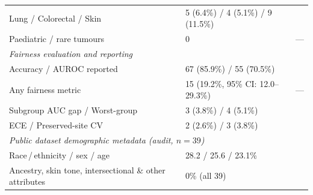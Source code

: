 \begin{table}[htbp]
\begin{tabularx}{\linewidth}{@{}l l X@{}}
    Lung / Colorectal / Skin & 5 (6.4\%) / 4 (5.1\%) / 9 (11.5\%) & \citep{chen2025predicting, huang2025knowledge, komen2024batch} \\
    Paediatric / rare tumours & 0 & --- \\
    \midrule
    \multicolumn{3}{l}{\textit{Fairness evaluation and reporting}} \\
    Accuracy / AUROC reported & 67 (85.9\%) / 55 (70.5\%) & \citep{campanella2019clinical, howard2021site, vaidya2024demographic} \\
    Any fairness metric & 15 (19.2\%, 95\% CI: 12.0--29.3\%) & --- \\
    Subgroup AUC gap / Worst-group & 3 (3.8\%) / 4 (5.1\%) & \citep{vaidya2024demographic, huang2025knowledge} \\
    ECE / Preserved-site CV & 2 (2.6\%) / 3 (3.8\%) & \citep{roschewitz2023automatic, howard2021site} \\
    \midrule
    \multicolumn{3}{l}{\textit{Public dataset demographic metadata (audit, $n=39$)}} \\
    Race\,/\,ethnicity / sex / age & 28.2 / 25.6 / 23.1\% & \citep{howard2021site, vaidya2024demographic} \\
    Ancestry, skin tone, intersectional \& other attributes & 0\% (all 39) & \citep{montezuma2025unbiased, norori2021addressing} \\
    \bottomrule
  \end{tabularx}
\end{table}

